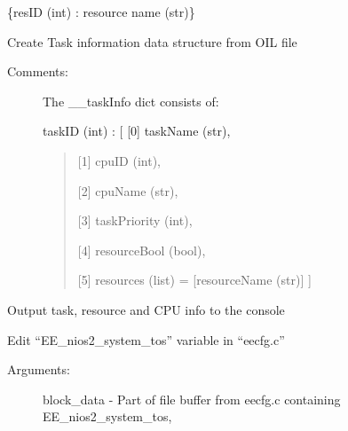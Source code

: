 \documentclass[letterpaper,10pt,english]{sphinxmanual}
\begin{document}
\begin{fulllineitems}
\begin{fulllineitems}
\begin{description}
\{resID (int) :   resource name (str)\}

\end{description}

\end{fulllineitems}


\begin{fulllineitems}
\label{\detokenize{code:FlexTool.FlexTool._FlexTool__createTaskData}}
Create Task information data structure from OIL file
\begin{description}
\item[{Comments:}] \leavevmode
The \_\_taskInfo dict consists of:

taskID (int) : {[}  {[}0{]} taskName (str),
\begin{quote}

{[}1{]} cpuID (int),

{[}2{]} cpuName (str),

{[}3{]} taskPriority (int),

{[}4{]} resourceBool (bool),

{[}5{]} resources (list) = {[}resourceName (str){]} {]}
\end{quote}

\end{description}

\end{fulllineitems}


\begin{fulllineitems}
\label{\detokenize{code:FlexTool.FlexTool._FlexTool__displayParams}}
Output task, resource and CPU info to the console

\end{fulllineitems}


\begin{fulllineitems}
\label{\detokenize{code:FlexTool.FlexTool._FlexTool__editSystemTos}}
Edit “EE\_nios2\_system\_tos” variable in “eecfg.c”
\begin{description}
\item[{Arguments:}] \leavevmode
block\_data - Part of file buffer from eecfg.c containing EE\_nios2\_system\_tos,


\end{description}
\end{fulllineitems}
\end{fulllineitems}
\end{document}
